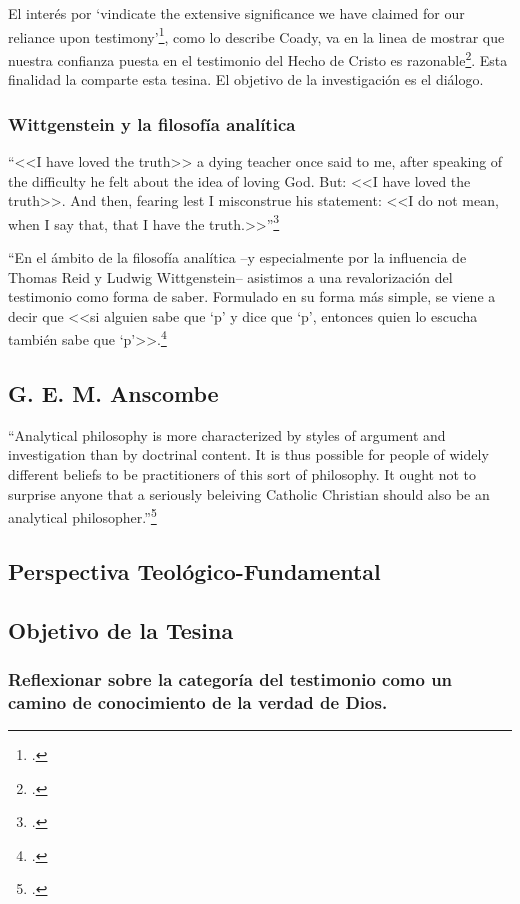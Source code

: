 \documentclass[12pt]{article}
\begin{document}
{El interés por `vindicate the extensive significance we have claimed for our reliance upon testimony'\footcite{testcoady}, como lo describe Coady, va en la linea de mostrar que nuestra confianza puesta en el testimonio del Hecho de Cristo es razonable\footcite[p.~267]{pradesmulticr}. Esta finalidad la comparte esta tesina. El objetivo de la investigación es el diálogo.

\subsubsection{Wittgenstein y la filosofía analítica}

``<<I have loved the truth>> a dying teacher once said to me, after speaking of the difficulty he felt about the idea of loving God. But: <<I have loved the truth>>. And then, fearing lest I misconstrue his statement: <<I do not mean, when I say that, that I have the truth.>>''\footcite[p.~71]{truthanscombe}

``En el ámbito de la filosofía analítica --y especialmente por la influencia de Thomas Reid y Ludwig Wittgenstein-- asistimos a una revalorización del testimonio como forma de saber. Formulado en su forma más simple, se viene a decir que <<si alguien sabe que `p' y dice que `p', entonces quien lo escucha también sabe que `p'>>.\footcite[p.~487]{feylogicaconesa}

\subsection{G. E. M. Anscombe}

``Analytical philosophy is more characterized by styles of argument and investigation than by doctrinal content. It is thus possible for people of widely different beliefs to be practitioners of this sort of philosophy. It ought not to surprise anyone that a seriously beleiving Catholic Christian should also be an analytical philosopher.''\footcite[p.~66]{opinionsanscombe}

\subsection{Perspectiva Teológico-Fundamental}


\subsection{Objetivo de la Tesina}
\subsubsection{Reflexionar sobre la categoría del testimonio como un camino de conocimiento de la verdad de Dios.}
}
\end{document}
